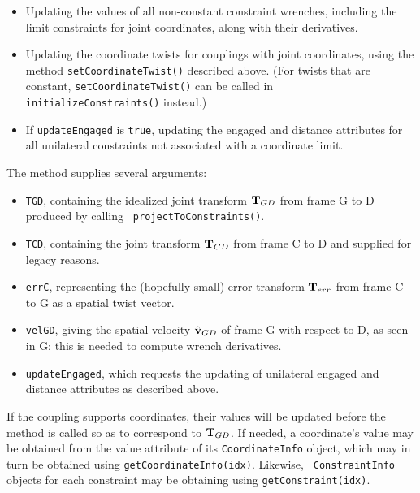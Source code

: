 \begin{itemize}

\item Updating the values of all non-constant constraint wrenches,
including the limit constraints for joint coordinates, along with their
derivatives.

\item Updating the coordinate twists for couplings with joint coordinates,
using the method {\tt setCoordinateTwist()} described above. (For twists that
are constant, {\tt setCoordinateTwist()} can be called in {\tt
initializeConstraints()} instead.)

\item If {\tt updateEngaged} is {\tt true}, updating the {\sf engaged}
and {\sf distance} attributes for all unilateral constraints not associated
with a coordinate limit.

\end{itemize}

The method supplies several arguments: 

\begin{itemize}

\item {\tt TGD}, containing the idealized joint transform
${\bf T}_{GD}$ from frame G to D produced by calling {\tt
projectToConstraints()}.

\item {\tt TCD}, containing the joint transform ${\bf T}_{CD}$ from
frame C to D and supplied for legacy reasons.

\item {\tt errC}, representing the (hopefully small) error transform
${\bf T}_{err}$ from frame C to G as a spatial twist vector.

\item {\tt velGD}, giving the spatial velocity $\hat{{\bf v}}_{GD}$ of frame
G with respect to D, as seen in G; this is needed to compute wrench
derivatives.

\item {\tt updateEngaged}, which requests the updating of unilateral
{\sf engaged} and {\sf distance} attributes as described above.

\end{itemize}

If the coupling supports coordinates, their values will be updated
before the method is called so as to correspond to ${\bf T}_{GD}$. If
needed, a coordinate's value may be obtained from the {\sf value}
attribute of its {\tt CoordinateInfo} object, which may in turn be
obtained using {\tt getCoordinateInfo(idx)}. Likewise, {\tt
ConstraintInfo} objects for each constraint may be obtaining using
{\tt getConstraint(idx)}.

